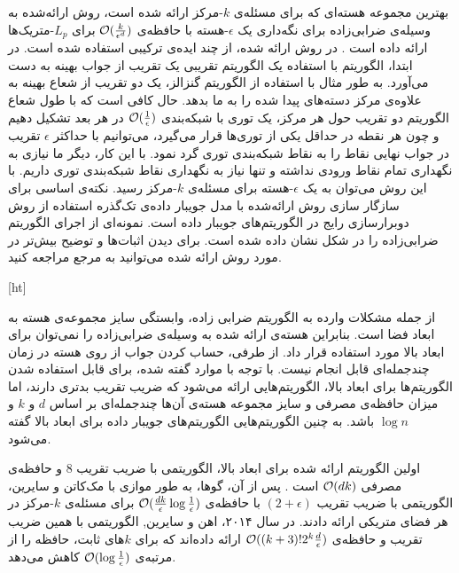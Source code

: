 بهترین مجموعه‌ هسته‌ای که برای مسئله‌ی $k$-مرکز‌ ارائه شده است، روش ارائه‌شده به وسیله‌ی ضرابی‌زاده برای نگه‌داری یک $\epsilon$-هسته با حافظه‌ی $\mathcal{O}(\frac{k}{\epsilon^d})$ برای $L_p$-متریک‌ها ارائه داده است . در روش ارائه شده، از چند ایده‌ی ترکیبی استفاده شده است. در ابتدا، الگوریتم با استفاده یک الگوریتم تقریبی یک تقریب از جواب بهینه به دست می‌آورد. به طور مثال با استفاده از‌ الگوریتم گنزالز، یک دو تقریب از شعاع بهینه به علاوه‌ی مرکز‌ دسته‌های پیدا شده را به ما بدهد. حال کافی است که با طول شعاع الگوریتم دو تقریب حول هر مرکز‌، یک توری با شبکه‌بندی $\mathcal{O}(\frac{1}{\epsilon})$ در هر بعد تشکیل دهیم و چون هر نقطه در حداقل یکی از توری‌ها قرار می‌گیرد، می‌توانیم با حداکثر $\epsilon$ تقریب در جواب نهایی نقاط را به نقاط شبکه‌بندی توری گرد نمود. با این کار، دیگر ما نیازی به نگهداری تمام نقاط ورودی نداشته و تنها نیاز به نگهداری نقاط شبکه‌بندی توری داریم. با این‌ روش می‌توان به یک $\epsilon$-هسته برای مسئله‌ی $k$-مرکز رسید. نکته‌ی اساسی برای سازگار سازی روش ارائه‌شده با مدل جویبار داده‌ی تک‌گذره استفاده از روش دوبرارسازی رایج در الگوریتم‌های جویبار داده است. نمونه‌ای از اجرای الگوریتم ضرابی‌زاده را در شکل  نشان داده شده است. برای دیدن اثبات‌ها و توضیح بیش‌تر در مورد روش ارائه شده می‌توانید به مرجع  مراجعه کنید.

[ht]

از جمله مشکلات وارده به الگوریتم ضرابی زاده، وابستگی سایز مجموعه‌ی هسته به ابعاد فضا است. بنابراین هسته‌ی ارائه شده به وسیله‌ی ضرابی‌زاده را نمی‌توان برای ابعاد بالا مورد استفاده قرار داد. از طرفی، حساب کردن جواب از روی هسته در زمان چند‌جمله‌ای قابل انجام نیست. با توجه با موارد گفته شده، برای قابل استفاده شدن الگوریتم‌ها برای ابعاد بالا، الگوریتم‌هایی ارائه می‌شود که ضریب تقریب بدتری دارند، اما میزان حافظه‌ی مصرفی و سایز مجموعه هسته‌‌ی آن‌ها چندجمله‌ای بر اساس $d$ و $k$ و $\log{n}$ باشد. به چنین الگوریتم‌هایی الگوریتم‌های جویبار داده برای ابعاد بالا گفته می‌شود. 

اولین الگوریتم ارائه شده برای ابعاد بالا،  الگوریتمی با ضریب تقریب $8$ و حافظه‌ی مصرفی $\mathcal{O}(dk)$ است . پس از آن، گوها، به طور موازی با مک‌کاتن و سایرین، الگوریتمی با ضریب تقریب $(2+\epsilon)$ با حافظه‌ی $\mathcal{O}(\frac{dk}{\epsilon} \log{\frac{1}{\epsilon}})$ برای مسئله‌ی $k$-مرکز در هر فضای متریکی ارائه دادند. در سال ۲۰۱۴، اهن و سایرین, الگوریتمی با همین ضریب تقریب و حافظه‌ی $\mathcal{O}((k+3)!2^k\frac{d}{\epsilon})$ ارائه داده‌اند که برای $k$‌های ثابت، حافظه را از مرتبه‌ی $\mathcal{O}(\log{\frac{1}{\epsilon}})$ کاهش می‌دهد. 

